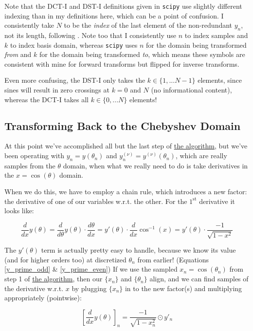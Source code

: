 \documentclass[10pt]{article}
\begin{document}
Note that the DCT-I and DST-I definitions given in \texttt{scipy}\cite{dct, dst} use slightly different indexing than in my definitions here, which can be a point of confusion. I consistently take $N$ to be the \textit{index} of the last element of the non-redundant $y_n$, not its length, following \cite{trefethen8}. Note too that I consistently use $n$ to index samples and $k$ to index basis domain, whereas \texttt{scipy} uses $n$ for the domain being transformed \textit{from} and $k$ for the domain being transformed \textit{to}, which means these symbols are consistent with mine for forward transforms but flipped for inverse transforms.

Even more confusing, the DST-I only takes the $k \in \{1, ... N-1\}$ elements, since sines will result in zero crossings at $k = 0$ and $N$ (no informational content), whereas the DCT-I takes all $k \in \{0, ... N\}$ elements!

\subsection{Transforming Back to the Chebyshev Domain}

At this point we've accomplished all but the last step of \hyperref[algo]{the algorithm}, but we've been operating with $y_n = y(\theta_n)$ and $y_n^{(\nu)} = y^{(\nu)}(\theta_n)$, which are really samples from the $\theta$ domain, when what we really need to do is take derivatives in the $x = \cos(\theta)$ domain.

When we do this, we have to employ a chain rule, which introduces a new factor: the derivative of one of our variables w.r.t. the other. For the $1^\text{st}$ derivative it looks like:

$$\frac{d}{dx} y(\theta) = \frac{d}{d\theta} y(\theta) \cdot \frac{d\theta}{dx} = y'(\theta) \cdot \frac{d}{dx} \cos^{-1}(x) = y'(\theta) \cdot \frac{-1}{\sqrt{1 - x^2}}$$

The $y'(\theta)$ term is actually pretty easy to handle, because we know its value (and for higher orders too) at discretized $\theta_n$ from earlier! (Equations \ref{y_prime_odd} \& \ref{y_prime_even}) If we use the sampled $x_n = \cos(\theta_n)$ from step 1 of \hyperref[algo]{the algorithm}, then our $\{x_n\}$ and $\{\theta_n\}$ align, and we can find samples of the derivative w.r.t. $x$ by plugging $\{x_n\}$ in to the new factor(s) and multiplying appropriately (pointwise):

$$[\frac{d}{dx} y(\theta)]_n = \frac{-1}{\sqrt{1 - x_n^2}} \odot y'_n$$
\end{document}
